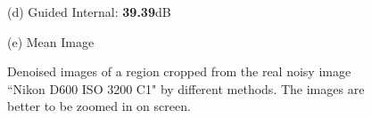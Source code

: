 \documentclass[10pt,twocolumn,letterpaper]{article}
\begin{document}
\begin{figure}
{\begin{minipage}[t]{0.195\textwidth}
{\footnotesize (d) Guided Internal: \textbf{39.39}dB }
\end{minipage}
\begin{minipage}[t]{0.195\textwidth}
\centering
{}
{\footnotesize (e) Mean Image \cite{crosschannel2016}}
\end{minipage}
}
\vspace{-2.5mm}
\caption{Denoised images of a region cropped from the real noisy image ``Nikon D600 ISO 3200 C1" \cite{crosschannel2016} by different methods. The 
\vspace{-1mm}
images are better to be zoomed in on screen.}

\label{fig4}
\end{figure}
\end{document}
